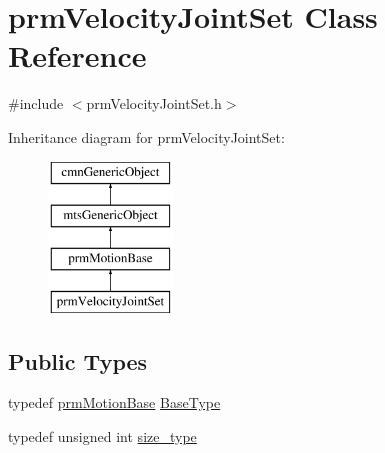 \hypertarget{classprm_velocity_joint_set}{}\section{prm\+Velocity\+Joint\+Set Class Reference}
\label{classprm_velocity_joint_set}


{\ttfamily \#include $<$prm\+Velocity\+Joint\+Set.\+h$>$}

Inheritance diagram for prm\+Velocity\+Joint\+Set\+:\begin{figure}[H]
\begin{center}
\leavevmode
\includegraphics[height=4.000000cm]{d5/da9/classprm_velocity_joint_set}
\end{center}
\end{figure}
\subsection*{Public Types}
\begin{DoxyCompactItemize}
\item 
typedef \hyperlink{classprm_motion_base}{prm\+Motion\+Base} \hyperlink{classprm_velocity_joint_set_a8cd5faa63ec2682c605ca6c6e1248f3a}{Base\+Type}
\item 
typedef unsigned int \hyperlink{classprm_velocity_joint_set_a48434c7a4127357203c7cff1e6f2a429}{size\+\_\+type}
\end{DoxyCompactItemize}
